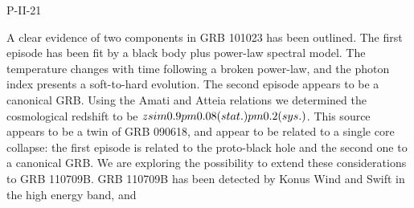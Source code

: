 P-II-21


\bigskip



\bigskip

\noindent A clear evidence of two components in GRB 101023 has been outlined. The first episode has been fit by a black body plus power-law spectral model. The temperature changes with time following a broken power-law, and the photon index presents a soft-to-hard evolution. The second episode appears to be a canonical GRB. Using the Amati and Atteia relations we determined the cosmological redshift to be $z \\sim 0.9 \\pm 0.08 (stat.) \\pm 0.2 (sys.)$. This source appears to be a twin of GRB 090618, and appear to be related to a single core collapse: the first episode is related to the proto-black hole and the second one to a canonical GRB. We are exploring the possibility to extend these considerations to GRB 110709B. GRB 110709B has been detected by Konus Wind and Swift in the high energy band, and
